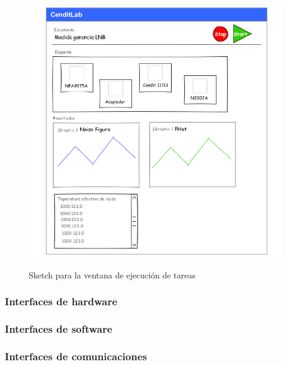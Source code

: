 \documentclass[paper=a4,oneside,fontsize=12pt]{scrartcl}
\begin{document}
	\begin{figure}[h!]
		\centering 
		\includegraphics[width=\textwidth]{Imagenes/ExecutionWindowUI.pdf}
		\label{Fig:ExecutionWindowUi} 
		\caption{Sketch para la ventana de ejecución de tareas}
	\end{figure}
	
	\subsubsection{Interfaces de hardware}
	
	\subsubsection{Interfaces de software}
	
	\subsubsection{Interfaces de comunicaciones}
	
\end{document}
